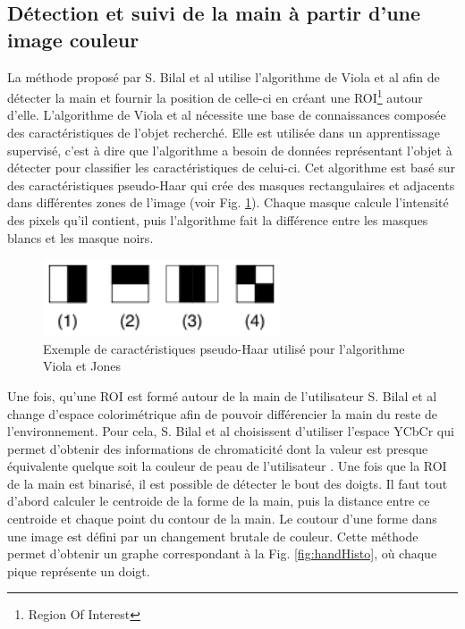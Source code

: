 \subsection{Détection et suivi de la main à partir d'une image couleur}
La méthode proposé par S. Bilal et al \cite{haarlike} utilise l'algorithme de Viola et al \cite{viola2001jones} afin
de détecter la main et fournir la position de celle-ci en créant une ROI\footnote{Region Of Interest} autour d'elle.
L'algorithme de Viola et al \cite{viola2001jones} nécessite une 
base de connaissances composée des caractéristiques de l'objet recherché. Elle est utilisée dans un 
apprentissage supervisé, c'est à dire que l'algorithme a besoin de données représentant
l'objet à détecter pour classifier les caractéristiques de celui-ci. Cet algorithme est basé sur des caractéristiques 
pseudo-Haar qui crée des masques rectangulaires et adjacents dans différentes zones de l'image (voir Fig. \ref{fig:pseudo_haar}). 
Chaque masque calcule l'intensité des pixels qu'il contient, puis l'algorithme fait la différence entre les masques blancs et les masque noirs.\\

\begin{figure}[!h]
\center
\includegraphics[width=7cm]{images/pseudo_haar.png}
\caption{Exemple de caractéristiques pseudo-Haar utilisé pour l'algorithme Viola et Jones}
\label{fig:pseudo_haar}
\end{figure}

Une fois, qu'une ROI est formé autour de la main de l'utilisateur S. Bilal et al \cite{haarlike} change d'espace colorimétrique
afin de pouvoir différencier la main du reste de l'environnement. Pour cela, S. Bilal et al \cite{haarlike} choisissent 
d'utiliser l'espace YCbCr qui permet d'obtenir des informations de chromaticité dont la valeur est presque équivalente
quelque soit la couleur de peau de l'utilisateur \cite{yoo1999fast}. Une fois que la ROI de la main est binarisé, il est possible
de détecter le bout des doigts. Il faut tout d'abord calculer le centroide de la forme de la main, puis la distance entre
ce centroide et chaque point du contour de la main. Le coutour d'une forme dans une image est défini par un changement brutale
de couleur. Cette méthode permet d'obtenir un graphe correspondant à la Fig. \ref{fig:handHisto}, où chaque pique représente un doigt.

